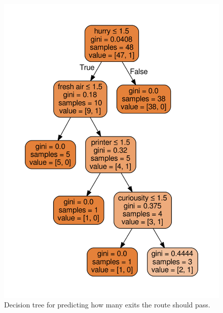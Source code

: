 \documentclass{sigchi}
\begin{document}
\begin{figure}[!h]
\centering
\includegraphics[width=1.0\columnwidth]{pics/decisionTree_3.png}
\caption{Decision tree for predicting how many exits the route should pass.}
\label{fig:dt3}
\end{figure}
\end{document}
